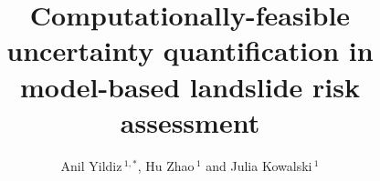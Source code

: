 \documentclass[utf8]{FrontiersinHarvard}
\def\firstAuthorLast{Yildiz {et~al.}}
\def\Authors{Anil Yildiz\,$^{1,*}$, Hu Zhao\,$^{1}$ and Julia Kowalski\,$^{1}$}
\begin{document}
\onecolumn
{}

\title[Uncertainty quantification in landslide risk]{Computationally-feasible uncertainty quantification in model-based landslide risk assessment}

\author[\firstAuthorLast ]{\Authors} 
\address{} 
\correspondance{} 
\extraAuth{}%


\maketitle
\end{document}
